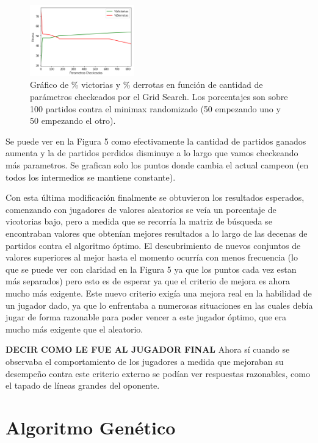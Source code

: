 \documentclass[A4paper,oneside,fleqn,11pt]{article}
\theoremstyle{definition}
\begin{document}
\begin{figure}
	\includegraphics[width=0.4\textwidth]{GridBack.png}
	\caption{ Gráfico de \% victorias y \% derrotas en función de cantidad de parámetros checkeados por el Grid Search. Los porcentajes son sobre 100 partidos contra el minimax randomizado (50 empezando uno y 50 empezando el otro).}
\end{figure}


Se puede ver en la Figura 5 como efectivamente la cantidad de partidos ganados aumenta y la de partidos perdidos disminuye a lo largo que vamos checkeando más parametros. Se grafican solo los puntos donde cambia el actual campeon (en todos los intermedios se mantiene constante).

Con esta última modificación finalmente se obtuvieron los resultados esperados, comenzando con jugadores de valores aleatorios se veía un porcentaje de vicotorias bajo, pero a medida que se recorría la matriz de búsqueda se encontraban valores que obtenían mejores resultados a lo largo de las decenas de partidos contra el algoritmo óptimo. El descubrimiento de nuevos conjuntos de valores superiores al mejor hasta el momento ocurría con menos frecuencia (lo que se puede ver con claridad en la Figura 5 ya que los puntos cada vez estan más separados) pero esto es de esperar ya que el criterio de mejora es ahora mucho más exigente. Este nuevo criterio exigía una mejora real en la habilidad de un jugador dado, ya que lo enfrentaba a numerosas situaciones en las cuales debía jugar de forma razonable para poder vencer a este jugador óptimo, que era mucho más exigente que el aleatorio. 



\textbf{DECIR COMO LE FUE AL JUGADOR FINAL}
Ahora sí cuando se observaba el comportamiento de los jugadores a medida que mejoraban su desempeño contra este criterio externo se podían ver respuestas razonables, como el tapado de líneas grandes del oponente.




\section{Algoritmo Genético}
\end{document}
